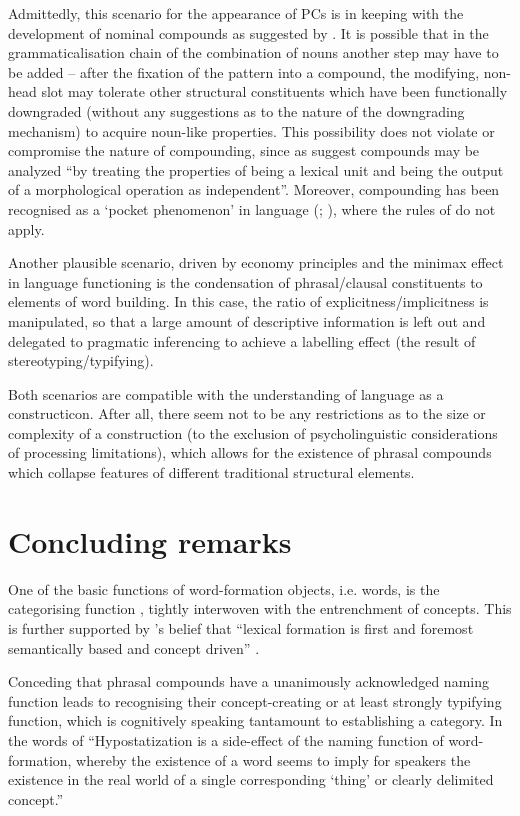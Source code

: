 \documentclass[output=paper]{LSP/langsci}
\begin{document}
Admittedly, this scenario for the appearance of PCs is in keeping with the development of nominal compounds as suggested by  \citet{HeineKuteva2009}. It is possible that in the grammaticalisation chain of the combination of nouns another step may have to be added – after the fixation of the pattern into a compound, the modifying, non-head slot may tolerate other structural constituents which have been functionally downgraded (without any suggestions as to the nature of the downgrading mechanism) to acquire noun-like properties. This possibility does not violate or compromise the nature of compounding, since as \citet[35]{Gaeta2009} suggest compounds may be analyzed “by treating the properties of being a lexical unit and being the output of a morphological operation as independent”. Moreover, compounding has been recognised as a `pocket phenomenon' in language (\citealt{Bauer2001}; \citealt{Jackendoff2009}), where the rules of  do not apply. 

Another plausible scenario, driven by  economy principles and the minimax effect in language functioning is the condensation of phrasal\slash clausal constituents to elements of word building. In this case, the ratio of explicitness\slash implicitness is manipulated, so that a large amount of descriptive information is left out and delegated to pragmatic inferencing to achieve a labelling effect (the result of stereotyping\slash typifying).  

Both scenarios are compatible with the understanding of language as a constructicon. After all, there seem not to be any restrictions as to the size or complexity of a construction (to the exclusion of psycholinguistic considerations of processing limitations), which allows for the existence of phrasal compounds which collapse features of different traditional structural elements. 


\section{Concluding remarks}\label{sec:bagasheva:6}

One of the basic functions of word-formation objects, i.e. words, is the categorising function \citep{Schmid2007}, tightly interwoven with the entrenchment of concepts. This is further supported by \citeauthor{Bolozky1999}’s belief that “lexical formation is first and foremost semantically based and concept driven” \citep[7]{Bolozky1999}. 

  Conceding that phrasal compounds have a unanimously acknowledged naming function leads to recognising their concept-creating or at least strongly typifying function, which is cognitively speaking tantamount to establishing a category. In the words of \citet[356]{Hohenhaus2005} ``Hypostatization is a side-effect of the naming function of word-formation, whereby the existence of a word seems to imply for speakers the existence in the real world of a single corresponding ‘thing’ or clearly delimited concept.'' 
\end{document}
